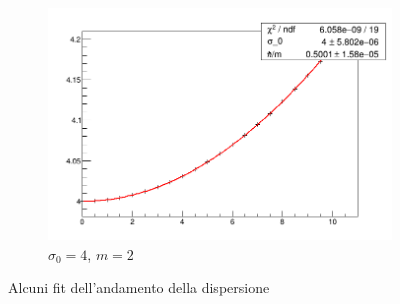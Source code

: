 \begin{figure}[htb]
\begin{subfigure}[b]{0.3\textwidth}
    \includegraphics[width=\linewidth]{IMG/dispersione_m2s4}
    \caption{$\sigma_0=4$, $m=2$}
  \end{subfigure}
  \caption{Alcuni fit dell'andamento della dispersione}\label{fig:dispersioneFitSigma4}
\end{figure}

